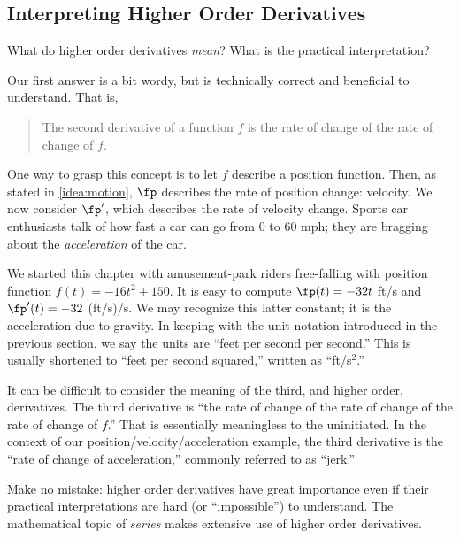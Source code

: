 \subsection{Interpreting Higher Order Derivatives}

What do higher order derivatives \textit{mean}? What is the practical interpretation? 

Our first answer is a bit wordy, but is technically correct and beneficial to understand. That is,
	\begin{quote}
	The second derivative of a function $f$ is the rate of change of the rate of change of $f$.
	\end{quote}

One way to grasp this concept is to let $f$ describe a position function. Then, as stated in \autoref{idea:motion}, $\fp$ describes the rate of position change: velocity. We now consider $\fp'$, which describes the rate of velocity change. Sports car enthusiasts talk of how fast a car can go from 0 to 60 mph; they are bragging about the \textit{acceleration} of the car.

We started this chapter with amusement-park riders free-falling with position function $f(t) = -16t^2+150$. It is easy to compute $\fp(t)=-32t$ ft/s and $\fp'(t) = -32$ (ft/s)/s. We may recognize this latter constant; it is the acceleration due to gravity. In keeping with the unit notation introduced in the previous section, we say the units are ``feet per second per second.'' This is usually shortened to ``feet per second squared,'' written as ``ft/s$^2$.''

It can be difficult to consider the meaning of the third, and higher order, derivatives. The third derivative is ``the rate of change of the rate of change of the rate of change of $f$.'' That is essentially meaningless to the uninitiated. In the context of our position/velocity/acceleration example, the third derivative is the ``rate of change of acceleration,'' commonly referred to as ``jerk.'' 

Make no mistake: higher order derivatives have great importance even if their practical interpretations are hard (or ``impossible'') to understand. The mathematical topic of \textit{series} makes extensive use of higher order derivatives.


